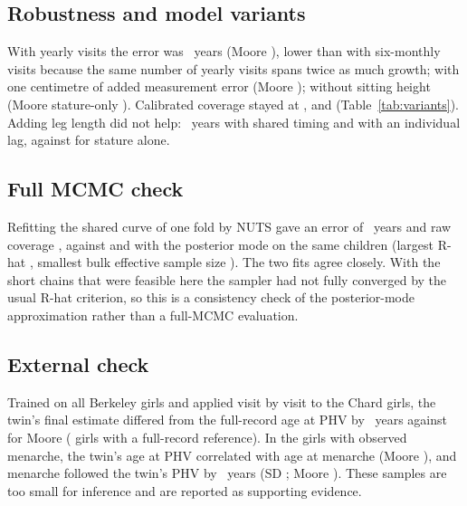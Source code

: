 \documentclass[journal]{IEEEtran}
\begin{document}
\subsection{Robustness and model variants}
With yearly visits the error was \TwYearlyMAE{}~years (Moore \TwYearlyMoore{}), lower than with
six-monthly visits because the same number of yearly visits spans twice as much growth; with one
centimetre of added measurement error \TwNoiseMAE{} (Moore \TwNoiseMoore{}); without sitting height
\TwNosittingMAE{} (Moore stature-only \TwNosittingMoore{}). Calibrated coverage stayed at
\TwYearlyCov{}, \TwNoiseCov{} and \TwNosittingCov{} (Table~\ref{tab:variants}). Adding leg length did
not help: \TwLegSharedMAE{}~years with shared timing and \TwLegLagMAE{} with an individual lag,
against \TwMainMAE{} for stature alone.

\begin{table}[!t]
\caption{Robustness (held-out data degraded) and leg-length variants (real data).}
\label{tab:variants}
\centering
\resizebox{\columnwidth}{!}{}
\end{table}

\subsection{Full MCMC check}
Refitting the shared curve of one fold by NUTS gave an error of \TwNutsMAE{}~years and raw coverage
\TwNutsCov{}, against \TwMapFoldMAE{} and \TwMapFoldCov{} with the posterior mode on the same
children (largest R-hat \TwNutsRhat{}, smallest bulk effective sample size \TwNutsESS{}).
The two fits agree closely. With the short chains that were feasible here the sampler had not fully
converged by the usual R-hat criterion, so this is a consistency check of the posterior-mode
approximation rather than a full-MCMC evaluation.

\subsection{External check}
Trained on all Berkeley girls and applied visit by visit to the \ChGirls{} Chard girls, the twin's
final estimate differed from the full-record age at PHV by \ChTwinMAE{}~years against \ChMooreMAE{}
for Moore (\ChRef{} girls with a full-record reference). In the \ChMen{} girls with observed
menarche, the twin's age at PHV correlated \ChCorrTwin{} with age at menarche (Moore
\ChCorrMoore{}), and menarche followed the twin's PHV by \ChLagMean{}~years (SD \ChLagSD{}; Moore
\ChMooreLagSD{}). These samples are too small for inference and are reported as supporting evidence.
\end{document}
